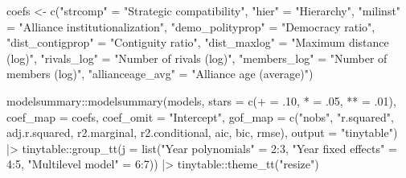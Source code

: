 \documentclass[
  12,
  letterpaper,
  DIV=11,
  numbers=noendperiod]{scrartcl}
\newenvironment{Shaded}{\begin{snugshade}}{\end{snugshade}}
\newcommand{\AttributeTok}[1]{\textcolor[rgb]{0.40,0.45,0.13}{#1}}
\newcommand{\DecValTok}[1]{\textcolor[rgb]{0.68,0.00,0.00}{#1}}
\newcommand{\FunctionTok}[1]{\textcolor[rgb]{0.28,0.35,0.67}{#1}}
\newcommand{\NormalTok}[1]{\textcolor[rgb]{0.00,0.23,0.31}{#1}}
\newcommand{\OtherTok}[1]{\textcolor[rgb]{0.00,0.23,0.31}{#1}}
\newcommand{\SpecialCharTok}[1]{\textcolor[rgb]{0.37,0.37,0.37}{#1}}
\newcommand{\StringTok}[1]{\textcolor[rgb]{0.13,0.47,0.30}{#1}}
\begin{document}
\begin{Shaded}
\begin{Highlighting}[numbers=left,,]
\NormalTok{coefs }\OtherTok{\textless{}{-}} \FunctionTok{c}\NormalTok{(}\StringTok{"strcomp"} \OtherTok{=} \StringTok{"Strategic compatibility"}\NormalTok{,}
           \StringTok{"hier"} \OtherTok{=} \StringTok{"Hierarchy"}\NormalTok{,}
           \StringTok{"milinst"} \OtherTok{=} \StringTok{"Alliance institutionalization"}\NormalTok{,}
           \StringTok{"demo\_polityprop"} \OtherTok{=} \StringTok{"Democracy ratio"}\NormalTok{,}
           \StringTok{"dist\_contigprop"} \OtherTok{=} \StringTok{"Contiguity ratio"}\NormalTok{,}
           \StringTok{"dist\_maxlog"} \OtherTok{=} \StringTok{"Maximum distance (log)"}\NormalTok{,}
           \StringTok{"rivals\_log"} \OtherTok{=} \StringTok{"Number of rivals (log)"}\NormalTok{,}
           \StringTok{"members\_log"} \OtherTok{=} \StringTok{"Number of members (log)"}\NormalTok{,}
           \StringTok{"allianceage\_avg"} \OtherTok{=} \StringTok{"Alliance age (average)"}\NormalTok{)}

\NormalTok{modelsummary}\SpecialCharTok{::}\FunctionTok{modelsummary}\NormalTok{(models, }
                           \AttributeTok{stars =} \FunctionTok{c}\NormalTok{(}\StringTok{\textquotesingle{}+\textquotesingle{}} \OtherTok{=}\NormalTok{ .}\DecValTok{10}\NormalTok{, }\StringTok{\textquotesingle{}*\textquotesingle{}} \OtherTok{=}\NormalTok{ .}\DecValTok{05}\NormalTok{, }\StringTok{\textquotesingle{}**\textquotesingle{}} \OtherTok{=}\NormalTok{ .}\DecValTok{01}\NormalTok{),}
                           \AttributeTok{coef\_map =}\NormalTok{ coefs,}
                           \AttributeTok{coef\_omit =} \StringTok{"Intercept"}\NormalTok{,}
                           \AttributeTok{gof\_map =} \FunctionTok{c}\NormalTok{(}\StringTok{"nobs"}\NormalTok{, }\StringTok{"r.squared"}\NormalTok{, }\StringTok{\textquotesingle{}adj.r.squared\textquotesingle{}}\NormalTok{, }\StringTok{\textquotesingle{}r2.marginal\textquotesingle{}}\NormalTok{, }\StringTok{\textquotesingle{}r2.conditional\textquotesingle{}}\NormalTok{, }\StringTok{\textquotesingle{}aic\textquotesingle{}}\NormalTok{, }\StringTok{\textquotesingle{}bic\textquotesingle{}}\NormalTok{, }\StringTok{\textquotesingle{}rmse\textquotesingle{}}\NormalTok{),}
                           \AttributeTok{output =} \StringTok{"tinytable"}\NormalTok{) }\SpecialCharTok{|\textgreater{}}
\NormalTok{  tinytable}\SpecialCharTok{::}\FunctionTok{group\_tt}\NormalTok{(}\AttributeTok{j =} \FunctionTok{list}\NormalTok{(}\StringTok{"Year polynomials"} \OtherTok{=} \DecValTok{2}\SpecialCharTok{:}\DecValTok{3}\NormalTok{, }\StringTok{"Year fixed effects"} \OtherTok{=} \DecValTok{4}\SpecialCharTok{:}\DecValTok{5}\NormalTok{, }\StringTok{"Multilevel model"} \OtherTok{=} \DecValTok{6}\SpecialCharTok{:}\DecValTok{7}\NormalTok{)) }\SpecialCharTok{|\textgreater{}}
\NormalTok{  tinytable}\SpecialCharTok{::}\FunctionTok{theme\_tt}\NormalTok{(}\StringTok{"resize"}\NormalTok{)}
\end{Highlighting}
\end{Shaded}
\end{document}
